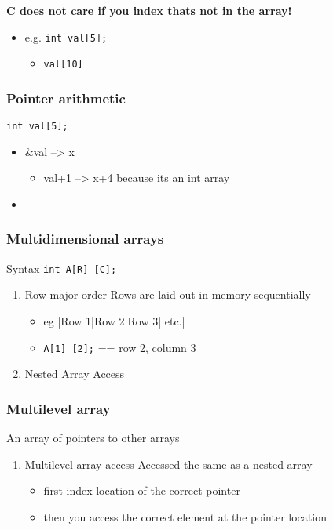 \documentclass[11pt]{article}
\begin{document}
\textbf{C does not care if you index thats not in the array!}
\begin{itemize}
\item e.g. \texttt{int val[5];}
\begin{itemize}
\item \texttt{val[10]}
\end{itemize}
\end{itemize}
\subsubsection{Pointer arithmetic}
\label{sec-9-4-1}
\texttt{int val[5];}
\begin{itemize}
\item \&val --> x
\begin{itemize}
\item val+1 --> x+4
because its an int array
\end{itemize}
\item 
\end{itemize}
\subsubsection{Multidimensional arrays}
\label{sec-9-4-2}
Syntax \texttt{int A[R] [C];}
\begin{enumerate}
\item Row-major order
\label{sec-9-4-2-1}
Rows are laid out in memory sequentially 
\begin{itemize}
\item eg  |Row 1|Row 2|Row 3| etc.|
\item \texttt{A[1] [2];} == row 2, column 3
\end{itemize}
\item Nested Array Access
\label{sec-9-4-2-2}
\end{enumerate}
\subsubsection{Multilevel array}
\label{sec-9-4-3}
An array of pointers to other arrays
\begin{enumerate}
\item Multilevel array access
\label{sec-9-4-3-1}
Accessed the same as a nested array
\begin{itemize}
\item first index location of the correct pointer
\item then you access the correct element at the pointer location
\end{itemize}
\end{enumerate}
\end{document}
